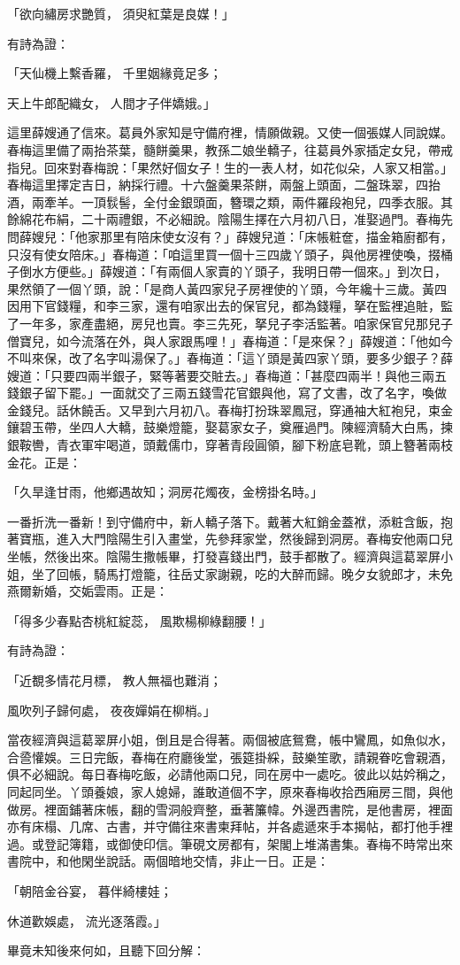 \begin{showcontents}{}
「欲向繡房求艷質，  須臾紅葉是良媒！」

有詩為證：

「天仙機上繫香羅，  千里姻緣竟足多；

天上牛郎配織女，  人間才子伴嬌娥。」

這里薛嫂通了信來。葛員外家知是守備府裡，情願做親。又使一個張媒人同說媒。春梅這里備了兩抬茶葉，髓餅羹果，教孫二娘坐轎子，往葛員外家插定女兒，帶戒指兒。回來對春梅說：「果然好個女子！生的一表人材，如花似朵，人家又相當。」春梅這里擇定吉日，納採行禮。十六盤羹果茶餅，兩盤上頭面，二盤珠翠，四抬酒，兩牽羊。一頂䯼髻，全付金銀頭面，簪環之類，兩件羅段袍兒，四季衣服。其餘綿花布絹，二十兩禮銀，不必細說。陰陽生擇在六月初八日，准娶過門。春梅先問薛嫂兒：「他家那里有陪床使女沒有？」薛嫂兒道：「床帳粧奩，描金箱廚都有，只沒有使女陪床。」春梅道：「咱這里買一個十三四歲丫頭子，與他房裡使喚，掇桶子倒水方便些。」薛嫂道：「有兩個人家賣的丫頭子，我明日帶一個來。」到次日，果然領了一個丫頭，說：「是商人黃四家兒子房裡使的丫頭，今年纔十三歲。黃四因用下官錢糧，和李三家，還有咱家出去的保官兒，都為錢糧，拏在監裡追賍，監了一年多，家產盡絕，房兒也賣。李三先死，拏兒子李活監著。咱家保官兒那兒子僧寶兒，如今流落在外，與人家跟馬哩！」春梅道：「是來保？」薛嫂道：「他如今不叫來保，改了名字叫湯保了。」春梅道：「這丫頭是黃四家丫頭，要多少銀子？薛嫂道：「只要四兩半銀子，緊等著要交賍去。」春梅道：「甚麼四兩半！與他三兩五錢銀子留下罷。」一面就交了三兩五錢雪花官銀與他，寫了文書，改了名字，喚做金錢兒。話休饒舌。又早到六月初八。春梅打扮珠翠鳳冠，穿通袖大紅袍兒，束金鑲碧玉帶，坐四人大轎，鼓樂燈籠，娶葛家女子，奠雁過門。陳經濟騎大白馬，揀銀鞍轡，青衣軍牢喝道，頭戴儒巾，穿著青段圓領，腳下粉底皂靴，頭上簪著兩枝金花。正是：

「久旱逢甘雨，他鄉遇故知；洞房花燭夜，金榜掛名時。」

一番折洗一番新！到守備府中，新人轎子落下。戴著大紅銷金蓋袱，添粧含飯，抱著寶瓶，進入大門陰陽生引入畫堂，先參拜家堂，然後歸到洞房。春梅安他兩口兒坐帳，然後出來。陰陽生撒帳畢，打發喜錢出門，鼓手都散了。經濟與這葛翠屏小姐，坐了回帳，騎馬打燈籠，往岳丈家謝親，吃的大醉而歸。晚夕女貌郎才，未免燕爾新婚，交姤雲雨。正是：

「得多少春點杏桃紅綻蕊，  風欺楊柳綠翻腰！」

有詩為證：

「近覩多情花月標，  教人無福也難消；

風吹列子歸何處，  夜夜嬋娟在柳梢。」

當夜經濟與這葛翠屏小姐，倒且是合得著。兩個被底鴛鴦，帳中鸞鳳，如魚似水，合巹懽娛。三日完飯，春梅在府廳後堂，張筵掛綵，鼓樂笙歌，請親眷吃會親酒，俱不必細說。每日春梅吃飯，必請他兩口兒，同在房中一處吃。彼此以姑妗稱之，同起同坐。丫頭養娘，家人媳婦，誰敢道個不字，原來春梅收拾西廂房三間，與他做房。裡面鋪著床帳，翻的雪洞般齊整，垂著簾幃。外邊西書院，是他書房，裡面亦有床榻、几席、古書，并守備往來書柬拜帖，并各處遞來手本揭帖，都打他手裡過。或登記簿籍，或御使印信。筆硯文房都有，架閣上堆滿書集。春梅不時常出來書院中，和他閑坐說話。兩個暗地交情，非止一日。正是：

「朝陪金谷宴，  暮伴綺樓娃；

休道歡娛處，  流光逐落霞。」

畢竟未知後來何如，且聽下回分解：





\end{showcontents}


